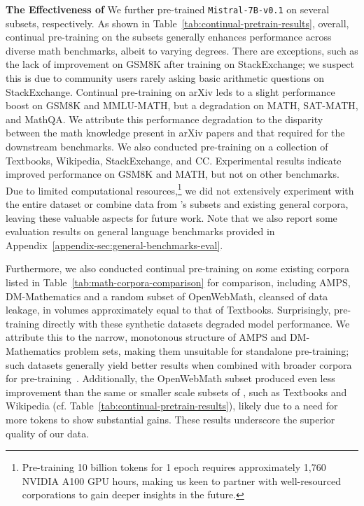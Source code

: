 \noindent\textbf{The Effectiveness of \mathpile} \quad We further pre-trained \texttt{Mistral-7B-v0.1} on several subsets, respectively.  As shown in Table~\ref{tab:continual-pretrain-results}, overall, continual pre-training on the subsets generally enhances performance across diverse math benchmarks, albeit to varying degrees. There are exceptions, such as the lack of improvement on GSM8K after training on StackExchange; we suspect this is due to community users rarely asking basic arithmetic questions on StackExchange. Continual pre-training on arXiv leds to a slight performance boost on GSM8K and MMLU-MATH, but a degradation on MATH, SAT-MATH, and MathQA. We attribute this performance degradation to the disparity between the math knowledge present in arXiv papers and that required for the downstream benchmarks. We also conducted pre-training on a collection of Textbooks, Wikipedia, StackExchange, and CC. Experimental results indicate improved performance on GSM8K and MATH, but not on other benchmarks.  Due to limited computational resources,\footnote{Pre-training 10 billion tokens for 1 epoch requires approximately 1,760 NVIDIA A100 GPU hours, making us keen to partner with well-resourced corporations to gain deeper insights in the future.} we did not extensively experiment with the entire dataset or combine data from \mathpile's subsets and existing general corpora, leaving these valuable aspects for future work. Note that we also report some evaluation results on general language benchmarks provided in Appendix~\ref{appendix-sec:general-benchmarks-eval}.

Furthermore, we also conducted continual pre-training on some existing corpora listed in Table~\ref{tab:math-corpora-comparison} for comparison, including AMPS, DM-Mathematics and a random subset of OpenWebMath, cleansed of data leakage, in volumes approximately equal to that of Textbooks. Surprisingly, pre-training directly with these synthetic datasets degraded model performance. We attribute this to the narrow, monotonous structure of AMPS and DM-Mathematics problem sets, making them unsuitable for standalone pre-training; such datasets generally yield better results when combined with broader corpora for pre-training~\citep{xu2024lemur}. Additionally, the OpenWebMath subset produced even less improvement than the same or smaller scale subsets of \mathpile, such as Textbooks and Wikipedia (cf. Table~\ref{tab:continual-pretrain-results}), likely due to a need for more tokens to show substantial gains. These results underscore the superior quality of our data.

